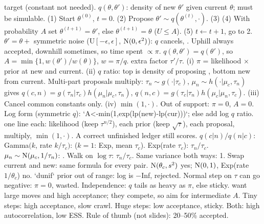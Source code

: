 \sk{} target  (constant not needed).  $q(\theta,\theta')$: density of new $\theta'$ given current $\theta$; must be simulable.
\sk(1) Start $\theta^{(0)}$, $t=0$. (2) Propose $\theta'\sim q(\theta^{(t)},\cdot)$. (3)
(4) With probability $A$ set $\theta^{(t+1)}=\theta'$, else $\theta^{(t+1)}=\theta$ ($U\le A$). (5) $t\leftarrow t+1$, go to 2.
\sk{} $\theta'=\theta+$ symmetric noise (U$[-\epsilon,\epsilon]$, $\mathrm{N}(0,\epsilon^2)$): $q$ cancels, . Uphill always accepted, downhill sometimes, so time spent $\propto\pi$.  $q(\theta,\theta')=q(\theta')$, so $A=\min\{1,w(\theta')/w(\theta)\}$, $w=\pi/q$.  extra factor $\tau'/\tau$.
\sk{} (i) $\pi$ = likelihood $\times$ prior at new and current. (ii) $q$ ratio: top is density of proposing , bottom new from current. Multi-part proposals multiply: $\tau_n\sim g(\cdot|\tau_c)$, $\mu_n\sim h(\cdot|\mu_c,\tau_n)$ gives $q(c,n)=g(\tau_n|\tau_c)h(\mu_n|\mu_c,\tau_n)$, $q(n,c)=g(\tau_c|\tau_n)h(\mu_c|\mu_n,\tau_c)$. (iii) Cancel common constants only. (iv) $\min(1,\cdot)$. Out of support: $\pi=0$, $A=0$. Log form (symmetric $q$): `A<-min(1,exp(lp(new)-lp(cur)))`; else add log $q$ ratio.
\sk{} one line each: likelihood (keep $\tau^{n/2}$), each prior (keep $\sqrt\tau$), each proposal, multiply, $\min(1,\cdot)$. A correct unfinished ledger still scores.
\sk{} $q(c|n)/q(n|c)$: Gamma$(k$, rate $k/\tau_c)$:  ($k=1$: Exp, mean $\tau_c$). Exp(rate $\tau_c$): $\tau_n/\tau_c$. $\mu_n\sim\mathrm{N}(\mu_c,1/\tau_n)$: . Walk on $\log\tau$: $\tau_n/\tau_c$. Same variance both ways: 1.
\sk{} Swap current and new: same formula for every pair. $\mathrm{N}(\theta_c,s^2)$ yes; $\mathrm{N}(0,1)$, Exp(rate $1/\theta_c$) no.  `dunif` prior out of range: log is $-$Inf, rejected. Normal step on $\tau$ can go negative: $\pi=0$, wasted. Independence: $q$ tails as heavy as $\pi$, else sticky.
\sk{} want large moves and high acceptance; they compete, so aim for intermediate $A$. Tiny steps: high acceptance, slow crawl. Huge steps: low acceptance, sticky. Both: high autocorrelation, low ESS. Rule of thumb (not slides): 20--50\% accepted.
